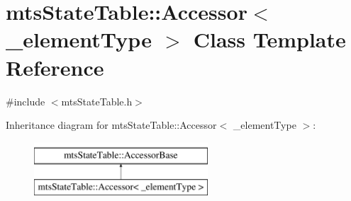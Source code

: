 \hypertarget{classmts_state_table_1_1_accessor}{\section{mts\-State\-Table\-:\-:Accessor$<$ \-\_\-element\-Type $>$ Class Template Reference}
\label{classmts_state_table_1_1_accessor}
}


{\ttfamily \#include $<$mts\-State\-Table.\-h$>$}

Inheritance diagram for mts\-State\-Table\-:\-:Accessor$<$ \-\_\-element\-Type $>$\-:\begin{figure}[H]
\begin{center}
\leavevmode
\includegraphics[height=2.000000cm]{d7/d31/classmts_state_table_1_1_accessor}
\end{center}
\end{figure}

